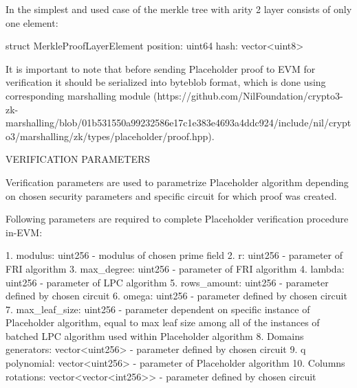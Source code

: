 In the simplest and used case of the merkle tree with arity 2 layer consists of only one element:

struct MerkleProofLayerElement {
    position: uint64
    hash: vector<uint8>
}

It is important to note that before sending Placeholder proof to EVM for verification it should be serialized into byteblob format, which is done using corresponding marshalling module (https://github.com/NilFoundation/crypto3-zk-marshalling/blob/01b531550a99232586e17c1e383e4693a4ddc924/include/nil/crypto3/marshalling/zk/types/placeholder/proof.hpp).

VERIFICATION PARAMETERS

Verification parameters are used to parametrize Placeholder algorithm depending on chosen security parameters and specific circuit for which proof was created.

Following parameters are required to complete Placeholder verification procedure in-EVM:

1. modulus: uint256 - modulus of chosen prime field
2. r: uint256 - parameter of FRI algorithm
3. max_degree: uint256 - parameter of FRI algorithm
4. lambda: uint256 - parameter of LPC algorithm
5. rows_amount: uint256 - parameter defined by chosen circuit
6. omega: uint256 - parameter defined by chosen circuit
7. max_leaf_size: uint256 - parameter dependent on specific instance of Placeholder algorithm, equal to max leaf size among all of the instances of batched LPC algorithm used within Placeholder algorithm
8. Domains generators: vector<uint256> - parameter defined by chosen circuit 
9. q polynomial: vector<uint256> - parameter of Placeholder algorithm
10. Columns rotations: vector<vector<int256>> - parameter defined by chosen circuit
